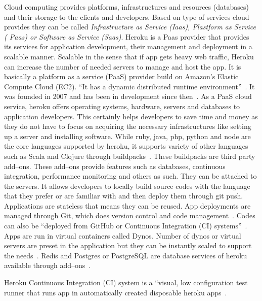 Cloud computing provides platforms, infrastructures and resources (databases)
 and their storage to the clients and developers. Based on type of services
 cloud provides they can be called \textit{Infrastructure as Service (Iaas),
 Plastform as Service ( Paas) or Software as Service (Saas)}. Heroku is a Paas
 provider that provides its services for application development, their management and
 deployment in a scalable manner. Scalable in the sense that if app gets 
 heavy web traffic, Heroku can increase the number of needed servers to manage
 and host the app. It is basically a platform as a service (PaaS) provider
 build on Amazon's Elastic Compute Cloud (EC2). ``It has a dynamic distributed
 runtime environment''~\cite{hid-sp18-415-www-devcenter-heroku}. It was founded
 in  2007 and has been
 in development since then~\cite{hid-sp18-415-www-wikipedia-org}.
 As a PaaS cloud service, heroku
 offers operating systems, hardware, servers and databases to application 
 developers. This certainly helps developers to save time and money as they do
 not have to focus on acquiring the necessary infrastructures like setting up 
 a server and installing software. While ruby, java, php, python and node are 
 the core languages supported by heroku, it supports variety 
 of other languages such as Scala and Clojure through 
 buildpacks~\cite{hid-sp18-415-www-wikipedia-org}.
 These buildpacks are third party add--ons. These add--ons provide features such as
 databases, continuous integration, performance monitoring and others as such. 
 They can be attached to the servers. It allows developers to locally build 
 source codes with the language that they prefer or are familiar with and then
 deploy them through git push. Applications are stateless that means they can 
 be reused. App deployments are managed through Git, which does version control
 and code management~\cite{hid-sp18-415-www-how-heroku-works}. Codes can also
 be ``deployed from GitHub or Continuous Integration (CI) 
 systems''~\cite{hid-sp18-415-www-heroku-com}.   
 Apps are run in virtual containers called Dynos. Number of dynos or virtual 
 servers are preset in the application but they can be instantly scaled to 
 support the needs~\cite{hid-sp18-415-www-how-heroku-works}. Redis and Postgres
 or PostgreSQL are database services of heroku available through 
 add--ons~\cite{hid-sp18-415-www-heroku-com}.

 Heroku Continuous Integration (CI) system is a ``visual, low configuration
 test runner that runs app in automatically created disposable 
 heroku apps~\cite{hid-sp18-415-www-heroku-ci}.

